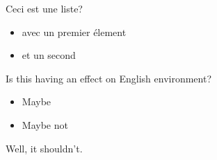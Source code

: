 \documentclass[french]{article}
\begin{document}
  Ceci est une liste?

  \begin{itemize}
    \item avec un premier élement \item et un second
  \end{itemize}

  \begin{english}
    Is this having an effect on English environment?

    \begin{itemize}
    \item Maybe
    \item Maybe not
    \end{itemize}

    Well, it shouldn't.

  \end{english}
\end{document}
